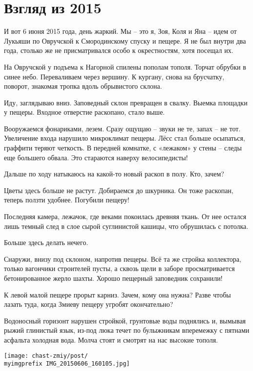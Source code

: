 \chapter{Взгляд из 2015}

И вот 6 июня 2015 года, день жаркий. Мы – это я, Зоя, Коля и Яна – идем от Лукьяши по Овручской к Смородинскому спуску и пещере. Я не был внутри два года, столько же не присматривался особо к окрестностям, хотя посещал их.

На Овручской у подъема к Нагорной спилены пополам тополя. Торчат обрубки в синее небо. Переваливаем через вершину. К кургану, снова на брусчатку, поворот, знакомая тропка вдоль обрывистого склона.

Иду, заглядываю вниз. Заповедный склон превращен в свалку. Выемка площадки у пещеры. Входное отверстие раскопано, стало выше.

Вооружаемся фонариками, лезем. Сразу ощущаю – звуки не те, запах – не тот. Увеличение входа нарушило микроклимат пещеры. Лёсс стал больше осыпаться, граффити теряют четкость. В передней комнатке, с «лежаком» у стены – следы еще большего обвала. Это стараются наверху велосипедисты!

Дальше по ходу натыкаюсь на какой-то новый раскоп в полу. Кто, зачем?

Цветы здесь больше не растут. Добираемся до шкурника. Он тоже раскопан, теперь ползти удобнее. Погубили пещеру!

Последняя камера, лежачок, где веками покоилась древняя ткань. От нее остался лишь темный след в слое сырой суглинистой кашицы, что обрушилась с потолка.
 
Больше здесь делать нечего.

Снаружи, внизу под склоном, напротив пещеры. Всё та же стройка коллектора, только вагончики строителей пусты, а сквозь щели в заборе просматривается бетонированное жерло шахты. Хорошо пещерный заповедник сохранили!

К левой малой пещере прорыт карниз. Зачем, кому она нужна? Разве чтобы лазать туда, когда Змиеву пещеру угробят окончательно?

Водоносный горизонт нарушен стройкой, грунтовые воды поднялись и, вымывая рыжий глинистый язык, из-под люка течет по булыжникам вперемежку с пятнами асфальта холодная вода. Молча стоят и смотрят на нас высокие тополя.

\vspace*{\fill}
\begin{center}
\texttt{[image: chast-zmiy/post/\\myimgprefix IMG\_20150606\_160105.jpg]}
\end{center}
\vspace*{\fill}